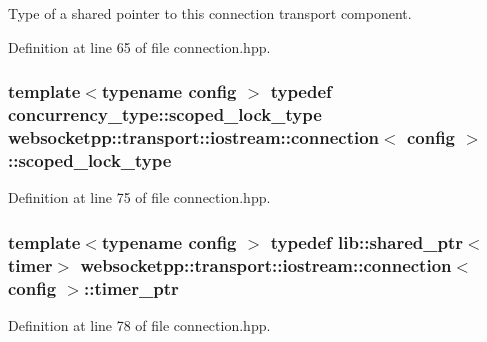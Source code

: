 Type of a shared pointer to this connection transport component. 



Definition at line 65 of file connection.\+hpp.

\hypertarget{classwebsocketpp_1_1transport_1_1iostream_1_1connection_ad4f3241a877a7e987f8452ca386f7e09}{}
\subsubsection[{scoped\+\_\+lock\+\_\+type}]{\setlength{\rightskip}{0pt plus 5cm}template$<$typename config $>$ typedef concurrency\+\_\+type\+::scoped\+\_\+lock\+\_\+type {\bf websocketpp\+::transport\+::iostream\+::connection}$<$ config $>$\+::{\bf scoped\+\_\+lock\+\_\+type}}\label{classwebsocketpp_1_1transport_1_1iostream_1_1connection_ad4f3241a877a7e987f8452ca386f7e09}


Definition at line 75 of file connection.\+hpp.

\hypertarget{classwebsocketpp_1_1transport_1_1iostream_1_1connection_a03c72162b1eaa9faa528bc16d9e0c2d0}{}
\subsubsection[{timer\+\_\+ptr}]{\setlength{\rightskip}{0pt plus 5cm}template$<$typename config $>$ typedef lib\+::shared\+\_\+ptr$<${\bf timer}$>$ {\bf websocketpp\+::transport\+::iostream\+::connection}$<$ config $>$\+::{\bf timer\+\_\+ptr}}\label{classwebsocketpp_1_1transport_1_1iostream_1_1connection_a03c72162b1eaa9faa528bc16d9e0c2d0}


Definition at line 78 of file connection.\+hpp.

\hypertarget{classwebsocketpp_1_1transport_1_1iostream_1_1connection_a39c8ef910236a223be66a8338962cb99}{}
